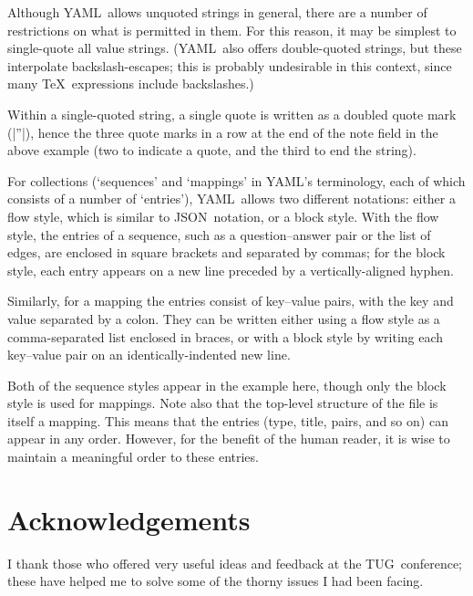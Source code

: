 \documentclass{article}
\def\YAML{{\small YAML}}
\def\JSON{{\small JSON}}
\def\TUG{{\small TUG}}
\begin{document}
Although \YAML\ allows unquoted strings in general, there are a number
of restrictions on what is permitted in them.  For this reason, it may
be simplest to single-quote all value strings.  (\YAML\ also offers
double-quoted strings, but these interpolate backslash-escapes; this
is probably undesirable in this context, since many \TeX\ expressions
include backslashes.)

Within a single-quoted string, a single quote is written as a doubled
quote mark (|''|), hence the three quote marks in a row at the
end of the note field in the above example (two to indicate a quote,
and the third to end the string).

For collections (`sequences' and `mappings' in \YAML's terminology,
each of which consists of a number of `entries'), \YAML\ allows two
different notations: either a flow style, which is similar to \JSON\
notation, or a block style.  With the flow style, the entries of a
sequence, such as a question--answer pair or the list of edges,
are enclosed in square brackets and separated by commas; for the block
style, each entry appears on a new line preceded by a
vertically-aligned hyphen.

Similarly, for a mapping the entries
consist of key--value pairs, with the key and value separated by a
colon.  They can be written either using a flow style as a
comma-separated list enclosed in braces, or with a block style by
writing each key--value pair on an identically-indented new line.

Both of the sequence styles appear in the example here, though only
the block style is used for mappings.  Note also that the top-level
structure of the file is itself a mapping.  This means that the
entries (type, title, pairs, and so on) can appear in any order.
However, for the benefit of the human reader, it is wise to maintain a
meaningful order to these entries.

\section*{Acknowledgements}

I thank those who offered very useful ideas and feedback at the \TUG\
conference; these have helped me to solve some of the thorny issues I
had been facing.

\smallskip


\end{document}
